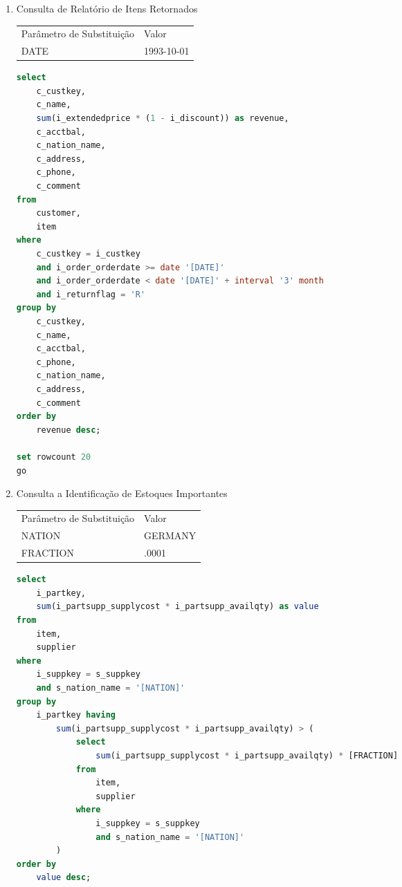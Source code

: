 \begin{enumerate}
	\begin{lstlisting}[language=SQL]
select
	nation,
	order_year,
	sum(amount) as sum_profit
from
	(
		select
			s_nation_name as nation,
			extract(year from i_order_orderdate) as order_year,
			i_extendedprice * (1 - i_discount) - i_partsupp_supplycost * i_quantity as amount
		from
			part,
			supplier,
			item
		where
			s_suppkey = i_suppkey
			and p_partkey = i_partkey
			and p_name like '%[COLOR]%'
	) as profit
group by
	nation,
	order_year
order by
	nation,
	order_year desc;

\end{lstlisting}

\item Consulta de Relatório de Itens Retornados

\begin{tabular}{ll}
	Parâmetro de Substituição & Valor\\
	DATE & 1993-10-01\\
\end{tabular}

	\begin{lstlisting}[language=SQL]
select
	c_custkey,
	c_name,
	sum(i_extendedprice * (1 - i_discount)) as revenue,
	c_acctbal,
	c_nation_name,
	c_address,
	c_phone,
	c_comment
from
	customer,
	item
where
	c_custkey = i_custkey
	and i_order_orderdate >= date '[DATE]'
	and i_order_orderdate < date '[DATE]' + interval '3' month
	and i_returnflag = 'R'
group by
	c_custkey,
	c_name,
	c_acctbal,
	c_phone,
	c_nation_name,
	c_address,
	c_comment
order by
	revenue desc;
	
set rowcount 20
go
	\end{lstlisting}

\item Consulta a Identificação de Estoques Importantes

\begin{tabular}{ll}
	Parâmetro de Substituição & Valor\\
	NATION & GERMANY\\
	FRACTION & .0001
\end{tabular}

	\begin{lstlisting}[language=SQL]
select
	i_partkey,
	sum(i_partsupp_supplycost * i_partsupp_availqty) as value
from
	item,
	supplier
where
	i_suppkey = s_suppkey
	and s_nation_name = '[NATION]'
group by
	i_partkey having
		sum(i_partsupp_supplycost * i_partsupp_availqty) > (
			select
				sum(i_partsupp_supplycost * i_partsupp_availqty) * [FRACTION]
			from
				item,
				supplier
			where
				i_suppkey = s_suppkey
				and s_nation_name = '[NATION]'
		)
order by
	value desc;
	\end{lstlisting}


\end{enumerate}
